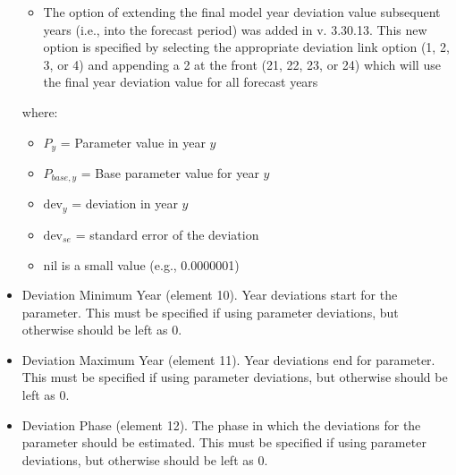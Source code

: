 \begin{itemize}
\begin{itemize}
		\item The option of extending the final model year deviation value subsequent years (i.e., into the forecast period) was added in v. 3.30.13.  This new option is specified by selecting the appropriate deviation link option (1, 2, 3, or 4) and appending a 2 at the front (21, 22, 23, or 24) which will use the final year deviation value for all forecast years
	\end{itemize}
	where: 
	\begin{itemize}
	     \item $P_{y}$ = Parameter value in year $y$
         \item $P_{base,y}$ = Base parameter value for year $y$
		 \item $\text{dev}_y$ = deviation in year $y$
		 \item $\text{dev}_{se}$ = standard error of the deviation
		 \item nil is a small value (e.g., 0.0000001)
	\end{itemize}
\item Deviation Minimum Year (element 10). Year deviations start for the parameter. This must be specified if using parameter deviations, but otherwise should be left as 0.
	
\item Deviation  Maximum Year (element 11). Year deviations end for parameter. This must be specified if using parameter deviations, but otherwise should be left as 0.
	
\item Deviation Phase (element 12). The phase in which the deviations for the parameter should be estimated. This must be specified if using parameter deviations, but otherwise should be left as 0.
	

\end{itemize}

